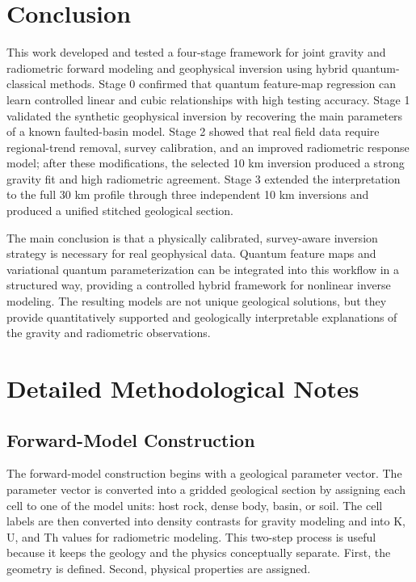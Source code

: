 \documentclass[12pt,a4paper]{article}
\begin{document}
\clearpage
\section{Conclusion}
This work developed and tested a four-stage framework for joint gravity and radiometric forward modeling and geophysical inversion using hybrid quantum-classical methods. Stage 0 confirmed that quantum feature-map regression can learn controlled linear and cubic relationships with high testing accuracy. Stage 1 validated the synthetic geophysical inversion by recovering the main parameters of a known faulted-basin model. Stage 2 showed that real field data require regional-trend removal, survey calibration, and an improved radiometric response model; after these modifications, the selected 10 km inversion produced a strong gravity fit and high radiometric agreement. Stage 3 extended the interpretation to the full 30 km profile through three independent 10 km inversions and produced a unified stitched geological section.

The main conclusion is that a physically calibrated, survey-aware inversion strategy is necessary for real geophysical data. Quantum feature maps and variational quantum parameterization can be integrated into this workflow in a structured way, providing a controlled hybrid framework for nonlinear inverse modeling. The resulting models are not unique geological solutions, but they provide quantitatively supported and geologically interpretable explanations of the gravity and radiometric observations.

\clearpage
\appendix
\section{Detailed Methodological Notes}
\subsection{Forward-Model Construction}
The forward-model construction begins with a geological parameter vector. The parameter vector is converted into a gridded geological section by assigning each cell to one of the model units: host rock, dense body, basin, or soil. The cell labels are then converted into density contrasts for gravity modeling and into K, U, and Th values for radiometric modeling. This two-step process is useful because it keeps the geology and the physics conceptually separate. First, the geometry is defined. Second, physical properties are assigned.
\end{document}

